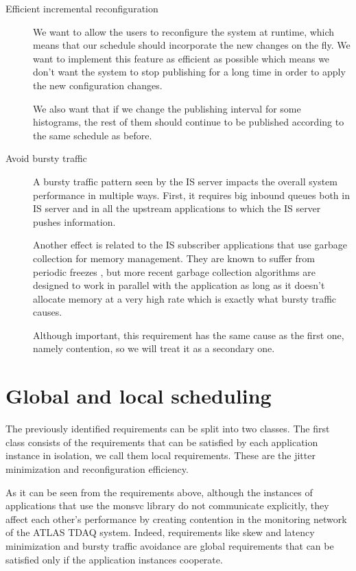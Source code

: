 \begin{description}
\item [Efficient incremental reconfiguration]

We want to allow the users to reconfigure the system at runtime, which means that our schedule should incorporate the new changes on the fly. We want to implement this feature as efficient as possible which means we don’t want the system to stop publishing for a long time in order to apply the new configuration changes. 

We also want that if we change the publishing interval for some histograms, the rest of them should continue to be published according to the same schedule as before.

\item [Avoid bursty traffic]

A bursty traffic pattern seen by the IS server impacts the overall system performance in multiple ways. First, it requires big inbound queues both in IS server and in all the upstream applications to which the IS server pushes information. 

Another effect is related to the IS subscriber applications that use garbage collection for memory management. They are known to suffer from periodic freezes \citep{aho2007compilers}, but more recent garbage collection algorithms \citep{printezis2005garbage} are designed to work in parallel with the application as long as it doesn’t allocate memory at a very high rate which is exactly what bursty traffic causes.

Although important, this requirement has the same cause as the first one, namely contention, so we will treat it as a secondary one.

\end{description}

\section*{Global and local scheduling}

The previously identified requirements can be split into two classes. The first class consists of the requirements that can be satisfied by each application instance in isolation, we call them local requirements. These are the jitter minimization and reconfiguration efficiency. 

As it can be seen from the requirements above, although the instances of applications that use the monsvc library do not communicate explicitly, they affect each other’s performance by creating contention in the monitoring network of the ATLAS TDAQ system. Indeed, requirements like skew and latency minimization and bursty traffic avoidance are global requirements that can be satisfied only if the application instances cooperate.

